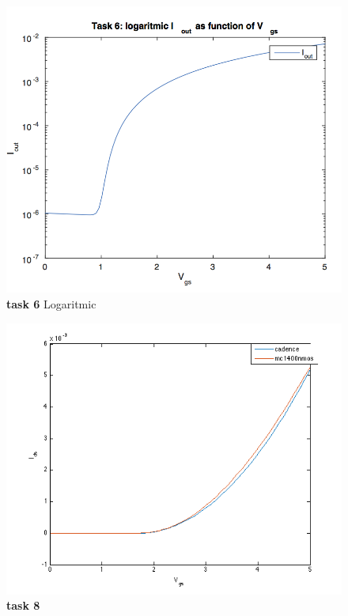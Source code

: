 \documentclass[11pt,a4paper,final]{report}
\begin{document}
\begin{figure}[ht!]
\caption{\textbf{task 6} Logaritmic}
\includegraphics[scale=1]{task6log.png}
\end{figure}

\begin{figure}[ht!]
\caption{\textbf{task 8}}
\includegraphics[scale=0.9]{task8.png}
\end{figure}
\end{document}
